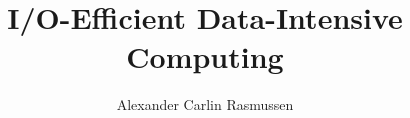 \documentclass[12pt]{externals/ucsddissertation/ucsddissertation}
\title{I/O-Efficient Data-Intensive Computing}
\author{Alexander Carlin Rasmussen}
\begin{document}
\frontmatter
\maketitle
\makecopyright
\makesignature



\tableofcontents
\listoffigures
\listoftables







\mainmatter









\backmatter

\end{document}
